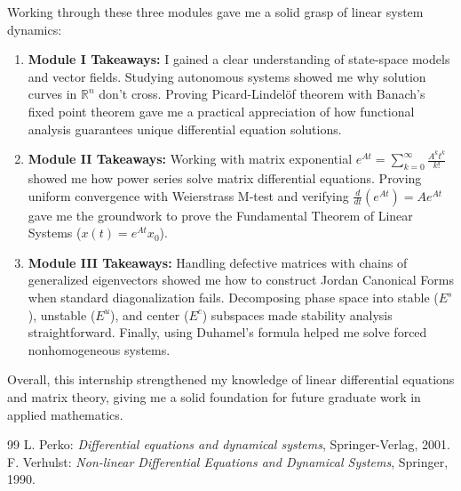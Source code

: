 \documentclass[12pt,a4paper,oneside]{article}
\theoremstyle{definition}
\theoremstyle{plain}
\begin{document}
\vspace{0.15cm}
Working through these three modules gave me a solid grasp of linear system dynamics:
\begin{enumerate}[label=\arabic*.]
    \item \textbf{Module I Takeaways:} I gained a clear understanding of state-space models and vector fields. Studying autonomous systems showed me why solution curves in $\mathbb{R}^n$ don't cross. Proving Picard-Lindelöf theorem with Banach's fixed point theorem gave me a practical appreciation of how functional analysis guarantees unique differential equation solutions.
    \item \textbf{Module II Takeaways:} Working with matrix exponential $e^{At} = \sum_{k=0}^{\infty} \frac{A^k t^k}{k!}$ showed me how power series solve matrix differential equations. Proving uniform convergence with Weierstrass M-test and verifying $\frac{d}{dt}(e^{At}) = A e^{At}$ gave me the groundwork to prove the Fundamental Theorem of Linear Systems ($x(t) = e^{At} x_0$).
    \item \textbf{Module III Takeaways:} Handling defective matrices with chains of generalized eigenvectors showed me how to construct Jordan Canonical Forms when standard diagonalization fails. Decomposing phase space into stable ($E^s$), unstable ($E^u$), and center ($E^c$) subspaces made stability analysis straightforward. Finally, using Duhamel's formula helped me solve forced nonhomogeneous systems.
\end{enumerate}

\vspace{0.25cm}
Overall, this internship strengthened my knowledge of linear differential equations and matrix theory, giving me a solid foundation for future graduate work in applied mathematics.

\newpage
\renewcommand{\refname}{References}

\begin{thebibliography}{99}
     L. Perko: \textit{Differential equations and dynamical systems}, Springer-Verlag, 2001.
     F. Verhulst: \textit{Non-linear Differential Equations and Dynamical Systems}, Springer, 1990.
\end{thebibliography}
\end{document}

